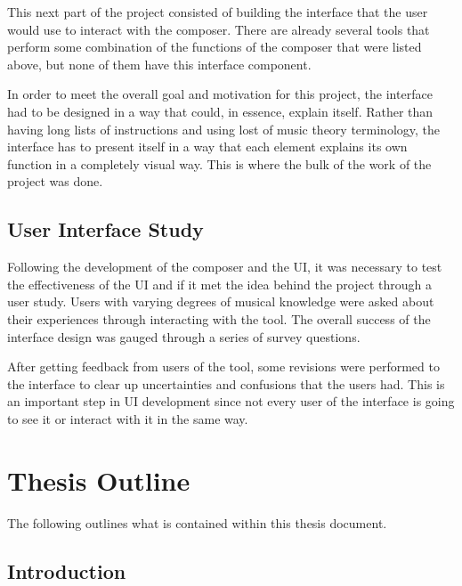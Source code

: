 This next part of the project consisted of building the interface that the user would use to interact with the composer.  There are already several tools that perform some combination of the functions of the composer that were listed above, but none of them have this interface component.

\vspace{\baselineskip}

In order to meet the overall goal and motivation for this project, the interface had to be designed in a way that could, in essence, explain itself.  Rather than having long lists of instructions and using lost of music theory terminology, the interface has to present itself in a way that each element explains its own function in a completely visual way.  This is where the bulk of the work of the project was done.

\subsection{User Interface Study}
\label{subsec:uistudy}

Following the development of the composer and the UI, it was necessary to test the effectiveness of the UI and if it met the idea behind the project through a user study.   Users with varying degrees of musical knowledge were asked about their experiences through interacting with the tool.  The overall success of the interface design was gauged through a series of survey questions.

\vspace{\baselineskip}

After getting feedback from users of the tool, some revisions were performed to the interface to clear up uncertainties and confusions that the users had.  This is an important step in UI development since not every user of the interface is going to see it or interact with it in the same way.

\section{Thesis Outline}
\label{sec:outline}

The following outlines what is contained within this thesis document.

\subsection{Introduction}
\label{subsec:outlineintro}

